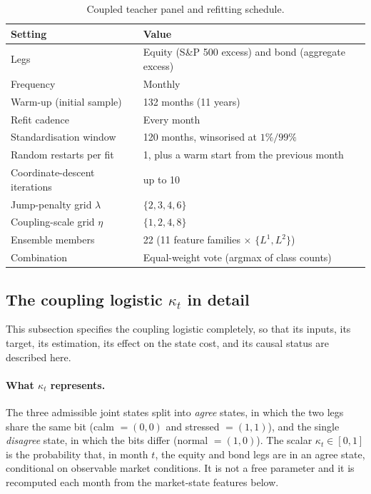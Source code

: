 \begin{table}[H]
\centering
\caption{Coupled teacher panel and refitting schedule.}
\label{tab:c-panel}
\small
\begin{tabular}{ll}
\toprule
Setting & Value \\
\midrule
Legs & Equity (S\&P 500 excess) and bond (aggregate excess) \\
Frequency & Monthly \\
Warm-up (initial sample) & 132 months (11 years) \\
Refit cadence & Every month \\
Standardisation window & 120 months, winsorised at $1\%/99\%$ \\
Random restarts per fit & 1, plus a warm start from the previous month \\
Coordinate-descent iterations & up to 10 \\
Jump-penalty grid $\lambda$ & $\{2,3,4,6\}$ \\
Coupling-scale grid $\eta$ & $\{1,2,4,8\}$ \\
Ensemble members & 22 (11 feature families $\times$ $\{L^1,L^2\}$) \\
Combination & Equal-weight vote (argmax of class counts) \\
\bottomrule
\end{tabular}
\end{table}

\subsection*{The coupling logistic $\kappa_t$ in detail}
\label{app:kappa-detail}

This subsection specifies the coupling logistic completely, so that its inputs, its target, its
estimation, its effect on the state cost, and its causal status are described here.

\paragraph{What $\kappa_t$ represents.}
The three admissible joint states split into \emph{agree} states, in which the two legs share
the same bit (calm $=(0,0)$ and stressed $=(1,1)$), and the single \emph{disagree} state, in
which the bits differ (normal $=(1,0)$). The scalar $\kappa_t\in[0,1]$ is the probability that,
in month $t$, the equity and bond legs are in an agree state, conditional on observable market
conditions. It is not a free parameter and it is recomputed each month
from the market-state features below.

